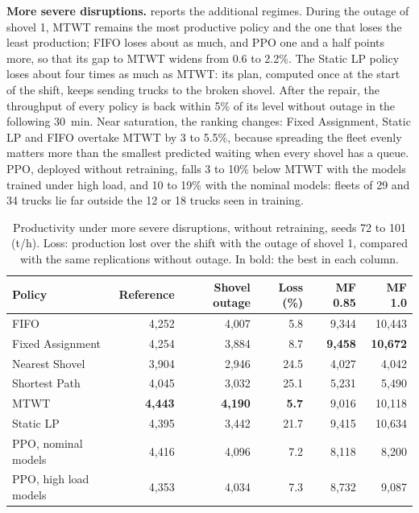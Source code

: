 \documentclass[11pt,a4paper]{article}
\newif\ifcorrmarks
\newcommand{\corr}[1]{\ifcorrmarks\textcolor{corrcolor}{#1}\else#1\fi}
\newenvironment{corrbloc}{\par\ifcorrmarks\color{corrcolor}\fi}{\par}
\begin{document}
\begin{corrbloc}
\textbf{More severe disruptions.}  reports the additional regimes. During the outage of shovel 1, MTWT remains the most productive policy and the one that loses the least production; FIFO loses about as much, and PPO one and a half points more, so that its gap to MTWT widens from 0.6 to 2.2\%. The \corr{Static LP} policy loses about four times as much as MTWT: its plan, computed once at the start of the shift, keeps sending trucks to the broken shovel. After the repair, the throughput of every policy is back within 5\% of its level without outage in the following 30~min. Near saturation, the ranking changes: Fixed Assignment, \corr{Static LP} and FIFO overtake MTWT by 3 to 5.5\%, because spreading the fleet evenly matters more than the smallest predicted waiting when every shovel has a queue. PPO, deployed without retraining, falls 3 to 10\% below MTWT with the models trained under high load, and 10 to 19\% with the nominal models: fleets of 29 and 34 trucks lie far outside the 12 or 18 trucks seen in training.

\begin{table}[H]
\centering
\caption{Productivity under more severe disruptions, without retraining, seeds 72 to 101 (t/h). Loss: production lost over the shift with the outage of shovel 1, compared with the same replications without outage. In bold: the best in each column.}
\label{tab:disruptions}
\small
\begin{tabular}{@{}lrrrrr@{}}
\toprule
\textbf{Policy} & \textbf{Reference} & \textbf{Shovel outage} & \textbf{Loss (\%)} & \textbf{MF 0.85} & \textbf{MF 1.0} \\
\midrule
FIFO & 4{,}252 & 4{,}007 & 5.8 & 9{,}344 & 10{,}443 \\
Fixed Assignment & 4{,}254 & 3{,}884 & 8.7 & \textbf{9{,}458} & \textbf{10{,}672} \\
Nearest Shovel & 3{,}904 & 2{,}946 & 24.5 & 4{,}027 & 4{,}042 \\
Shortest Path & 4{,}045 & 3{,}032 & 25.1 & 5{,}231 & 5{,}490 \\
MTWT & \textbf{4{,}443} & \textbf{4{,}190} & \textbf{5.7} & 9{,}016 & 10{,}118 \\
\corr{Static LP} & 4{,}395 & 3{,}442 & 21.7 & 9{,}415 & 10{,}634 \\
\midrule
PPO, nominal models & 4{,}416 & 4{,}096 & 7.2 & 8{,}118 & 8{,}200 \\
PPO, high load models & 4{,}353 & 4{,}034 & 7.3 & 8{,}732 & 9{,}087 \\
\bottomrule
\end{tabular}
\end{table}
\end{corrbloc}
\end{document}
